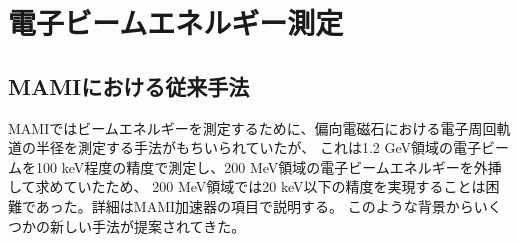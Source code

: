 \documentclass[a4paper,11pt,uplatex]{jsbook}
\begin{document}
\section{電子ビームエネルギー測定}
\subsection{MAMIにおける従来手法}
MAMIではビームエネルギーを測定するために、偏向電磁石における電子周回軌道の半径を測定する手法がもちいられていたが、
これは1.2 GeV領域の電子ビームを100 keV程度の精度で測定し、200 MeV領域の電子ビームエネルギーを外挿して求めていたため、
200 MeV領域では20 keV以下の精度を実現することは困難であった。詳細はMAMI加速器の項目で説明する。
このような背景からいくつかの新しい手法が提案されてきた。
\end{document}

